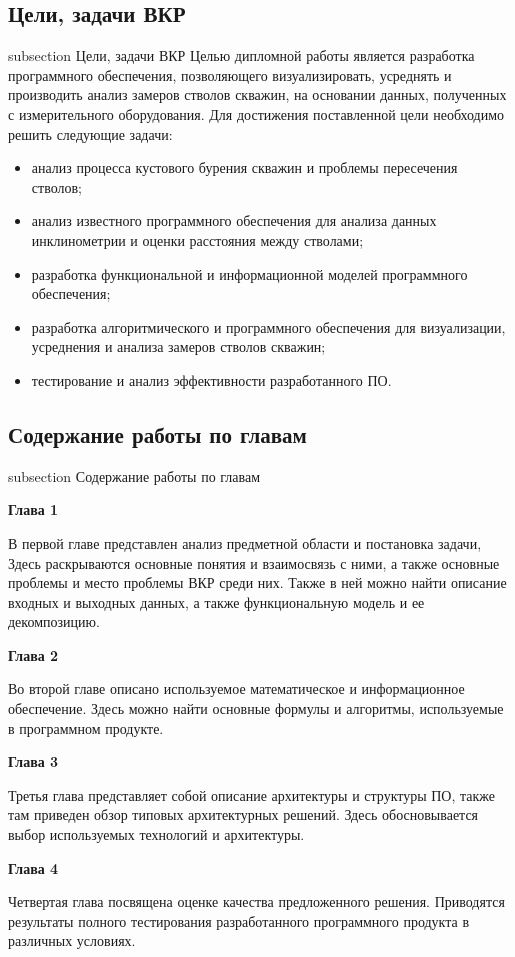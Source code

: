 \subsection*{Цели, задачи ВКР}
 {subsection} {Цели, задачи ВКР}
Целью дипломной работы является разработка программного обеспечения, позволяющего визуализировать, усреднять и производить анализ замеров стволов скважин,
на основании данных, полученных с измерительного оборудования. Для достижения поставленной цели необходимо решить следующие задачи:
\begin{itemize}
  \item анализ процесса кустового бурения скважин и проблемы пересечения стволов;
  \item анализ известного  программного обеспечения для анализа данных инклинометрии и оценки расстояния между стволами;
  \item разработка функциональной и информационной моделей программного обеспечения;
  \item разработка алгоритмического и программного обеспечения для визуализации, усреднения и анализа замеров стволов скважин;
  \item тестирование и анализ эффективности разработанного ПО.
\end{itemize}

\newpage
\subsection*{Содержание работы по главам}
 {subsection} {Содержание работы по главам}

\textbf{Глава 1}

В первой главе представлен анализ предметной области и постановка задачи, Здесь раскрываются основные понятия и взаимосвязь с ними,
а также основные проблемы и место проблемы ВКР среди них. Также в ней можно найти описание входных и выходных данных, а также функциональную модель и
ее декомпозицию.

\textbf{Глава 2}

Во второй главе описано используемое математическое и информационное обеспечение. Здесь можно найти основные формулы и алгоритмы, используемые в
программном продукте.

\textbf{Глава 3}

Третья глава представляет собой описание архитектуры и структуры ПО, также там приведен обзор типовых архитектурных решений. Здесь обосновывается выбор
используемых технологий и архитектуры.

\textbf{Глава 4}

Четвертая глава посвящена оценке качества предложенного решения. Приводятся результаты полного тестирования разработанного
программного продукта в различных условиях.
